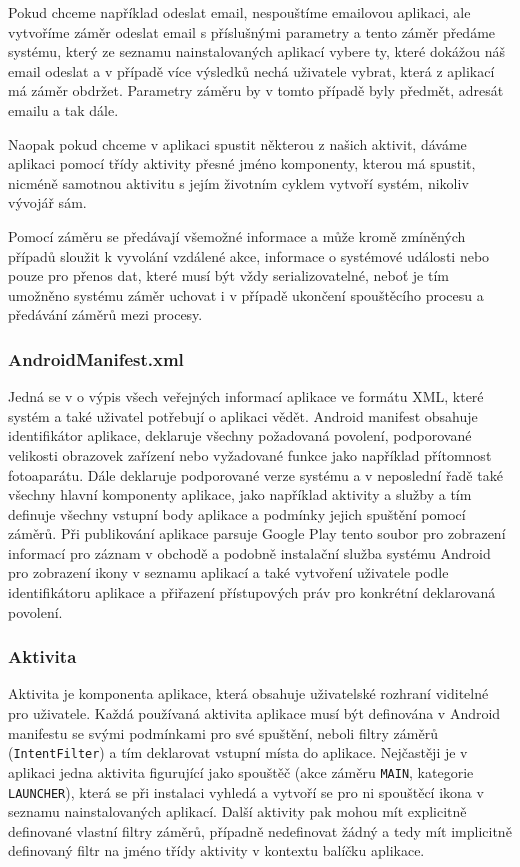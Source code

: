 \documentclass[czech,master,public,dept460,male,java,cpdeclaration]{diploma}
\begin{document}
Pokud chceme například odeslat email, nespouštíme emailovou aplikaci, ale vytvoříme záměr odeslat email
s příslušnými parametry a tento záměr předáme systému, který ze seznamu nainstalovaných aplikací vybere
ty, které dokážou náš email odeslat a v případě více výsledků nechá uživatele vybrat, která z aplikací
má záměr obdržet. Parametry záměru by v tomto případě byly předmět, adresát emailu a tak dále.

Naopak pokud chceme v aplikaci spustit některou z našich aktivit, dáváme aplikaci pomocí třídy
aktivity přesné jméno komponenty, kterou má spustit, nicméně samotnou aktivitu s jejím životním
cyklem vytvoří systém, nikoliv vývojář sám.

Pomocí záměru se předávají všemožné informace a může kromě zmíněných případů sloužit k vyvolání
vzdálené akce, informace o systémové události nebo pouze pro přenos dat, které musí být vždy
serializovatelné, neboť je tím umožněno systému záměr uchovat i v případě ukončení spouštěcího
procesu a předávání záměrů mezi procesy.

\subsubsection{AndroidManifest.xml}
Jedná se v o výpis všech veřejných informací aplikace ve formátu XML, které systém
a také uživatel potřebují o aplikaci vědět. Android manifest obsahuje identifikátor aplikace, deklaruje všechny
požadovaná povolení, podporované velikosti obrazovek zařízení nebo vyžadované funkce jako například přítomnost
fotoaparátu. Dále deklaruje podporované verze systému a v neposlední řadě také všechny hlavní komponenty
aplikace, jako například aktivity a služby a tím definuje všechny vstupní body aplikace a podmínky
jejich spuštění pomocí záměrů. Při publikování aplikace
parsuje Google Play tento soubor pro zobrazení informací pro záznam v obchodě a podobně instalační služba
systému Android pro zobrazení ikony v seznamu aplikací a také vytvoření uživatele podle identifikátoru
aplikace a přiřazení přístupových práv pro konkrétní deklarovaná povolení.

\subsubsection{Aktivita}
Aktivita je komponenta aplikace, která obsahuje uživatelské rozhraní viditelné pro uživatele. Každá
 používaná aktivita aplikace musí být definována v Android manifestu se svými podmínkami pro své
 spuštění, neboli filtry záměrů (\texttt{IntentFilter}) a tím deklarovat vstupní místa do aplikace.
 Nejčastěji je v aplikaci jedna aktivita figurující jako spouštěč (akce záměru \texttt{MAIN},
 kategorie \texttt{LAUNCHER}), která se při
  instalaci vyhledá a vytvoří se pro ni spouštěcí ikona v seznamu nainstalovaných aplikací. Další
  aktivity pak mohou mít explicitně definované vlastní filtry záměrů, případně nedefinovat žádný
  a tedy mít implicitně definovaný filtr na jméno třídy aktivity v kontextu balíčku aplikace.
\end{document}
